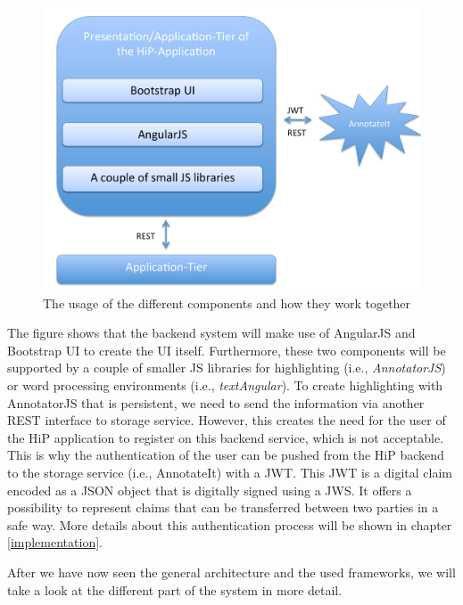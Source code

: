  \begin{figure}[th]
\centerline{\includegraphics[width=1\textwidth]{gfx/components}}
\caption{The usage of the different components and how they work together}
\label{hip:components}
\end{figure}

The figure shows that the backend system will make use of AngularJS and Bootstrap UI to create the \ac{UI} itself. Furthermore, these two components will be supported by a couple of smaller \ac{JS} libraries for highlighting (i.e., \emph{AnnotatorJS}) or word processing environments (i.e., \emph{textAngular}). To create highlighting with AnnotatorJS that is persistent, we need to send the information via another \ac{REST} interface to storage service.
However, this creates the need for the user of the \ac{HiP} application to register on this backend service, which is not acceptable. This is why the authentication of the user can be pushed from the \ac{HiP} backend to the storage service (i.e., AnnotateIt) with a \ac{JWT}. This \ac{JWT} is a digital claim encoded as a \ac{JSON} object that is digitally signed using a \ac{JWS}. It offers a possibility to represent claims that can be transferred between two parties in a safe way. More details about this authentication process will be shown in chapter \ref{implementation}.

After we have now seen the general architecture and the used frameworks, we will take a look at the different part of the system in more detail.
 
